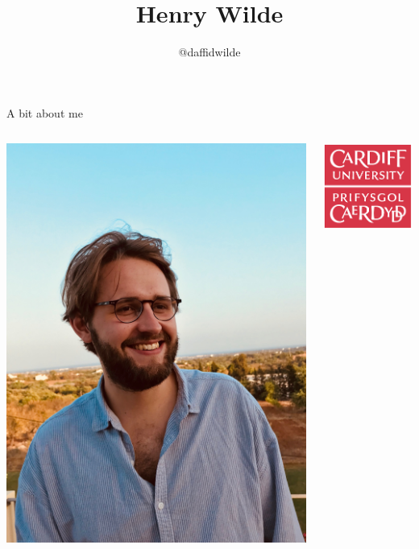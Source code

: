 \documentclass{beamer}
\title{Henry Wilde}
\author{@daffidwilde}
\date{}
\begin{document}
\frame{\titlepage}
\graphicspath{{./static/}}


\begin{frame}{A bit about me}

    \begin{columns}[T]
        \begin{column}{.5\textwidth}
            \centering
            \includegraphics[width=\linewidth]{sun.jpg}
        \end{column}%
        \begin{column}{.5\textwidth}
            \centering
            \includegraphics[width=.5\linewidth]{cu_logo.png}\\

\end{column}
\end{columns}
\end{frame}
\end{document}
